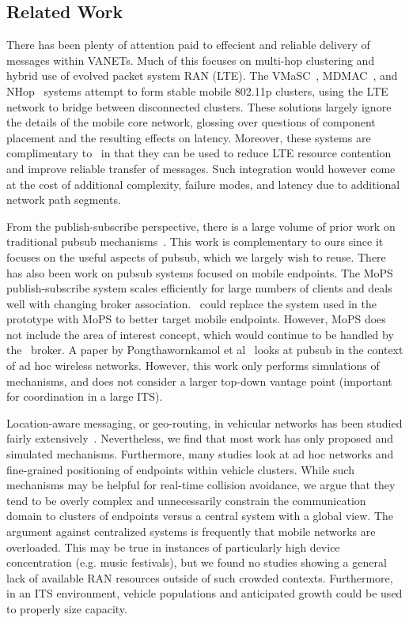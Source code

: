 \subsection{Related Work}

There has been plenty of attention paid to effecient and reliable
delivery of messages within VANETs.  Much of this focuses on multi-hop
clustering and hybrid use of evolved packet system RAN (LTE).  The
VMaSC~\cite{ucar2016multihop}, MDMAC~\cite{wolny2008modified}, and
NHop~\cite{zhang2011novel} systems attempt to form stable mobile
802.11p clusters, using the LTE network to bridge between disconnected
clusters. These solutions largely ignore the details of the mobile
core network, glossing over questions of component placement and the
resulting effects on latency. Moreover, these systems are
complimentary to \name~in that they can be used to reduce LTE
resource contention and improve reliable transfer of messages. Such
integration would however come at the cost of additional complexity,
failure modes, and latency due to additional network path segments.

From the publish-subscribe perspective, there is a large volume of
prior work on traditional pubsub mechanisms~\cite{ps1,ps2,ps3,ps4}.
This work is complementary to ours since it focuses on the useful
aspects of pubsub, which we largely wish to reuse. There has also been
work on pubsub systems focused on mobile endpoints. The
MoPS~\cite{nasim2014mobile} publish-subscribe system scales
efficiently for large numbers of clients and deals well with changing
broker association.  \name~could replace the \pubsub system used in
the prototype with MoPS to better target mobile endpoints. However,
MoPS does not include the area of interest concept, which would
continue to be handled by the \name~broker. A paper by
Pongthawornkamol et al~\cite{pongthawornkamol2007analysis} looks at
pubsub in the context of ad hoc wireless networks. However, this work
only performs simulations of mechanisms, and does not consider a
larger top-down vantage point (important for coordination in a large
ITS).

Location-aware messaging, or geo-routing, in vehicular networks has
been studied fairly extensively~\cite{bilal2013position}.
Nevertheless, we find that most work has only proposed and simulated
mechanisms. Furthermore, many studies look at ad hoc networks and
fine-grained positioning of endpoints within vehicle clusters.  While
such mechanisms may be helpful for real-time collision avoidance, we
argue that they tend to be overly complex and unnecessarily constrain
the communication domain to clusters of endpoints versus a central
system with a global view. The argument against centralized systems is
frequently that mobile networks are overloaded. This may be true in
instances of particularly high device concentration (e.g. music
festivals), but we found no studies showing a general lack of
available RAN resources outside of such crowded contexts.
Furthermore, in an ITS environment, vehicle populations and
anticipated growth could be used to properly size capacity.

